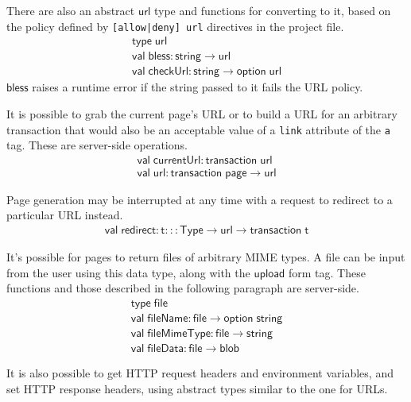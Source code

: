 \documentclass{article}
\newcommand{\mt}[1]{\mathsf{#1}}
\begin{document}
There are also an abstract $\mt{url}$ type and functions for converting to it, based on the policy defined by \texttt{[allow|deny] url} directives in the project file.
$$\begin{array}{l}
  \mt{type} \; \mt{url} \\
  \mt{val} \; \mt{bless} : \mt{string} \to \mt{url} \\
  \mt{val} \; \mt{checkUrl} : \mt{string} \to \mt{option} \; \mt{url}
\end{array}$$
$\mt{bless}$ raises a runtime error if the string passed to it fails the URL policy.

It is possible to grab the current page's URL or to build a URL for an arbitrary transaction that would also be an acceptable value of a \texttt{link} attribute of the \texttt{a} tag.  These are server-side operations.
$$\begin{array}{l}
  \mt{val} \; \mt{currentUrl} : \mt{transaction} \; \mt{url} \\
  \mt{val} \; \mt{url} : \mt{transaction} \; \mt{page} \to \mt{url}
\end{array}$$

Page generation may be interrupted at any time with a request to redirect to a particular URL instead.
$$\begin{array}{l}
  \mt{val} \; \mt{redirect} : \mt{t} ::: \mt{Type} \to \mt{url} \to \mt{transaction} \; \mt{t}
\end{array}$$

It's possible for pages to return files of arbitrary MIME types.  A file can be input from the user using this data type, along with the $\mt{upload}$ form tag.  These functions and those described in the following paragraph are server-side.
$$\begin{array}{l}
  \mt{type} \; \mt{file} \\
  \mt{val} \; \mt{fileName} : \mt{file} \to \mt{option} \; \mt{string} \\
  \mt{val} \; \mt{fileMimeType} : \mt{file} \to \mt{string} \\
  \mt{val} \; \mt{fileData} : \mt{file} \to \mt{blob}
\end{array}$$

It is also possible to get HTTP request headers and environment variables, and set HTTP response headers, using abstract types similar to the one for URLs.
\end{document}
